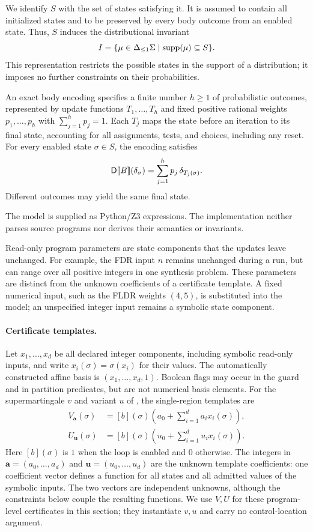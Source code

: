We identify $S$ with the set of states satisfying it.
It is assumed to contain all initialized states and to be preserved
by every body outcome from an enabled state.
Thus, $S$ induces the distributional invariant
\[
 I=\{\mu\in{\Delta_{\leq 1}\Sigma}\mid \operatorname{supp}(\mu)\subseteq S\}.
\]
This representation restricts the possible states in the support of
a distribution; it imposes no further constraints on their probabilities.

An exact body encoding specifies a finite number $h\geq1$ of
probabilistic outcomes, represented by update functions
$T_1,\ldots,T_h$ and fixed positive rational weights
$p_1,\ldots,p_h$ with $\sum_{j=1}^{h}p_j=1$.
Each $T_j$ maps the state before an iteration to its final state,
accounting for all assignments, tests, and choices, including any reset.
For every enabled state $\sigma\in S$, the encoding satisfies
\[
 \mathsf{D}\llbracket B\rrbracket(\delta_{\sigma})
 =\sum_{j=1}^{h}p_j\,\delta_{T_j(\sigma)}.
\]
Different outcomes may yield the same final state.

The model is supplied as Python/Z3 expressions.
The implementation neither parses source programs nor derives
their semantics or invariants.

Read-only program parameters are state components that the updates leave
unchanged. For example, the FDR input $n$ remains unchanged during a run,
but can range over all positive integers in one synthesis problem.
These parameters are distinct from the unknown coefficients of a
certificate template. A fixed numerical input, such as the FLDR weights
$(4,5)$, is substituted into the model; an unspecified integer input
remains a symbolic state component.

\paragraph{Certificate templates.}
Let $x_1,\ldots,x_d$ be all declared integer components, including
symbolic read-only inputs, and write $x_i(\sigma)=\sigma(x_i)$ for
their values. The automatically constructed affine basis is
$(x_1,\ldots,x_d,1)$. Boolean flags may occur in the guard and in
partition predicates, but are not numerical basis elements.
For the supermartingale $v$ and variant $u$ of ,
the single-region templates are
\[
 \begin{aligned}
 V_{\mathbf a}(\sigma)&=[b](\sigma)
   \left(a_0+\sum_{i=1}^{d}a_i x_i(\sigma)\right),\\
 U_{\mathbf u}(\sigma)&=[b](\sigma)
   \left(u_0+\sum_{i=1}^{d}u_i x_i(\sigma)\right).
 \end{aligned}
\]
Here $[b](\sigma)$ is $1$ when the loop is enabled and $0$ otherwise.
The integers in $\mathbf a=(a_0,\ldots,a_d)$ and
$\mathbf u=(u_0,\ldots,u_d)$ are the unknown template coefficients:
one coefficient vector defines a function for all states and all
admitted values of the symbolic inputs. The two vectors are independent
unknowns, although the constraints below couple the resulting functions.
We use $V,U$ for these program-level certificates in this section;
they instantiate $v,u$ and carry no control-location argument.

